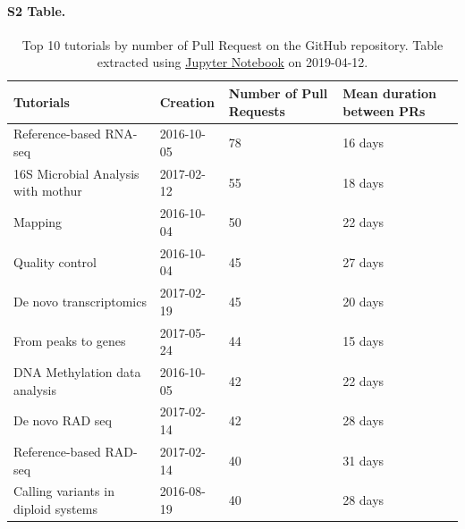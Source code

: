\documentclass[10pt,letterpaper]{article}
\begin{document}
\paragraph*{S2 Table.}
\label{S2_Table}
\begin{table}[]
\begin{adjustwidth}{-2.25in}{0in} %
	\centering
	\caption{Top 10 tutorials by number of Pull Request on the GitHub repository. Table extracted using \href{https://github.com/bebatut/galaxy-training-material-stats/blob/master/src/extract_repo_content_stats.ipynb}{Jupyter Notebook} on 2019-04-12.\label{tbl:topEditedTutorials}}
	\begin{tabular}{l|lll}
		Tutorials                           & Creation   & Number of Pull Requests & Mean duration between PRs\\\hline
		Reference-based RNA-seq             & 2016-10-05 & 78                      & 16 days\\
		16S Microbial Analysis with mothur  & 2017-02-12 & 55                      & 18 days\\
		Mapping                             & 2016-10-04 & 50                      & 22 days\\
		Quality control                     & 2016-10-04 & 45                      & 27 days\\
		De novo transcriptomics             & 2017-02-19 & 45                      & 20 days\\
		From peaks to genes                 & 2017-05-24 & 44                      & 15 days\\
		DNA Methylation data analysis       & 2016-10-05 & 42                      & 22 days\\
		De novo RAD seq                     & 2017-02-14 & 42                      & 28 days\\
		Reference-based RAD-seq             & 2017-02-14 & 40                      & 31 days\\
		Calling variants in diploid systems & 2016-08-19 & 40                      & 28 days\\
	\end{tabular}
\end{adjustwidth}
\end{table}
\end{document}
